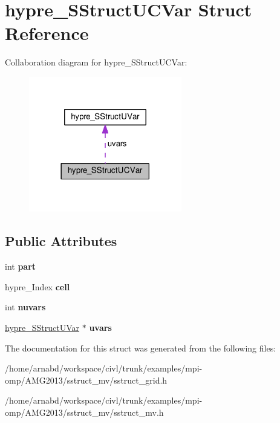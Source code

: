 \hypertarget{structhypre__SStructUCVar}{}\section{hypre\+\_\+\+S\+Struct\+U\+C\+Var Struct Reference}
\label{structhypre__SStructUCVar}


Collaboration diagram for hypre\+\_\+\+S\+Struct\+U\+C\+Var\+:
\nopagebreak
\begin{figure}[H]
\begin{center}
\leavevmode
\includegraphics[width=189pt]{structhypre__SStructUCVar__coll__graph}
\end{center}
\end{figure}
\subsection*{Public Attributes}
\begin{DoxyCompactItemize}
\item 
\hypertarget{structhypre__SStructUCVar_adf10b2e2d54b9d1b2fac03dcb167d977}{}int {\bfseries part}\label{structhypre__SStructUCVar_adf10b2e2d54b9d1b2fac03dcb167d977}

\item 
\hypertarget{structhypre__SStructUCVar_aa19a8de21249ba6db68f4e306660af32}{}hypre\+\_\+\+Index {\bfseries cell}\label{structhypre__SStructUCVar_aa19a8de21249ba6db68f4e306660af32}

\item 
\hypertarget{structhypre__SStructUCVar_afa8fcbbe0b9d2725dd55687a5dc89fbf}{}int {\bfseries nuvars}\label{structhypre__SStructUCVar_afa8fcbbe0b9d2725dd55687a5dc89fbf}

\item 
\hypertarget{structhypre__SStructUCVar_acc39925ccb5542547a2acf7b293d8f35}{}\hyperlink{structhypre__SStructUVar}{hypre\+\_\+\+S\+Struct\+U\+Var} $\ast$ {\bfseries uvars}\label{structhypre__SStructUCVar_acc39925ccb5542547a2acf7b293d8f35}

\end{DoxyCompactItemize}


The documentation for this struct was generated from the following files\+:\begin{DoxyCompactItemize}
\item 
/home/arnabd/workspace/civl/trunk/examples/mpi-\/omp/\+A\+M\+G2013/sstruct\+\_\+mv/sstruct\+\_\+grid.\+h\item 
/home/arnabd/workspace/civl/trunk/examples/mpi-\/omp/\+A\+M\+G2013/sstruct\+\_\+mv/sstruct\+\_\+mv.\+h\end{DoxyCompactItemize}

